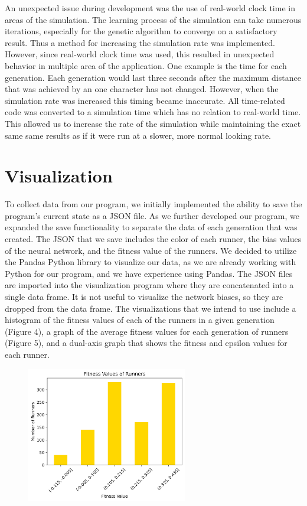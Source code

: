 \documentclass[letterpaper]{article} %
\begin{document}
\par An unexpected issue during development was the use of real-world clock time in areas of the simulation. The learning process of the simulation can take numerous iterations, especially for the genetic algorithm to converge on a satisfactory result. Thus a method for increasing the simulation rate was implemented. However, since real-world clock time was used, this resulted in unexpected behavior in multiple area of the application. One example is the time for each generation. Each generation would last three seconds after the maximum distance that was achieved by an one character has not changed. However, when the simulation rate was increased this timing became inaccurate. All time-related code was converted to a simulation time which has no relation to real-world time. This allowed us to increase the rate of the simulation while maintaining the exact same same results as if it were run at a slower, more normal looking rate.

\section{Visualization}

\par To collect data from our program, we initially implemented the ability to save the program's current state as a JSON file. As we further developed our program, we expanded the save functionality to separate the data of each generation that was created. The JSON that we save includes the color of each runner, the bias values of the neural network, and the fitness value of the runners. We decided to utilize the Pandas Python library to visualize our data, as we are already working with Python for our program, and we have experience using Pandas. The JSON files are imported into the visualization program where they are concatenated into a single data frame. It is not useful to visualize the network biases, so they are dropped from the data frame. The visualizations that we intend to use include a histogram of the fitness values of each of the runners in a given generation (Figure 4), a graph of the average fitness values for each generation of runners (Figure 5), and a dual-axis graph that shows the fitness and epsilon values for each runner.

\begin{figure}[h]
\caption
\centering
\includegraphics[width=7cm]{fitness_dist.png}
\end{figure}
\end{document}
